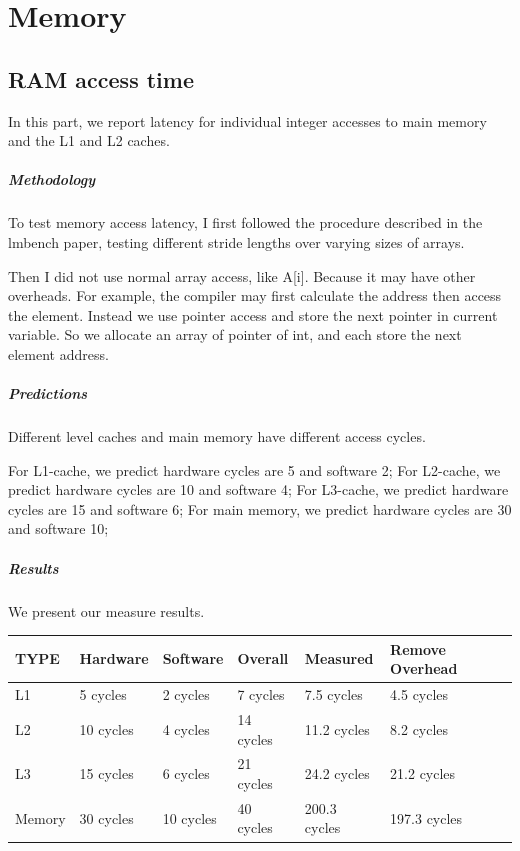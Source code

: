 \chapter{Memory}

\section{RAM access time}
In this part, we report latency for individual integer accesses to main memory and the L1 and L2 caches.

\paragraph{Methodology}
To test memory access latency, I first followed the procedure described in the lmbench paper, testing different stride lengths over varying sizes of arrays. 

Then I did not use normal array access, like A[i]. Because it may have other overheads. For example, the compiler may first calculate the address then access the element. Instead we use pointer access and store the next pointer in current variable. So we allocate an array of pointer of int, and each store the next element address.

\paragraph{Predictions}
Different level caches and main memory have different access cycles.

For L1-cache, we predict hardware cycles are 5 and software 2;
For L2-cache, we predict hardware cycles are 10 and software 4;
For L3-cache, we predict hardware cycles are 15 and software 6;
For main memory, we predict hardware cycles are 30 and software 10;

\paragraph{Results}
We present our measure results.

\begin{center}
\begin{tabular}{| p{1.5cm} | p{2cm} | p{2cm} | p{2cm} | p{2.5cm} | p{3cm} |}
TYPE             & Hardware  & Software  & Overall  & Measured  & Remove Overhead \\
\hline

L1	&   5 cycles  & 2 cycles & 7 cycles  &  7.5  cycles &  4.5 cycles \\
L2    &   10 cycles & 4 cycles & 14 cycles & 11.2 cycles &  8.2 cycles \\
L3 	&   15 cycles & 6 cycles & 21 cycles &  24.2 cycles & 21.2 cycles \\
Memory & 30 cycles & 10 cycles & 40 cycles & 200.3 cycles & 197.3 cycles \\
\end{tabular}
\end{center}


